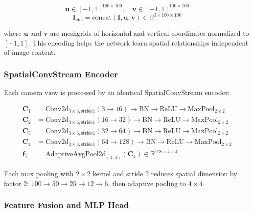 \documentclass[12pt,a4paper,oneside]{report}
\begin{document}
\begin{equation}
\mathbf{u} \in [-1, 1]^{100 \times 100}, \quad \mathbf{v} \in [-1, 1]^{100 \times 100}
\end{equation}
\begin{equation}
\mathbf{I}_{\text{enc}} = \text{concat}(\mathbf{I}, \mathbf{u}, \mathbf{v}) \in \mathbb{R}^{3 \times 100 \times 100}
\end{equation}

where $\mathbf{u}$ and $\mathbf{v}$ are meshgrids of horizontal and vertical coordinates normalized to $[-1, 1]$. This encoding helps the network learn spatial relationships independent of image content.

\subsubsection{SpatialConvStream Encoder}
\label{subsubsec:spatialconvstream_encoder}

Each camera view is processed by an identical SpatialConvStream encoder:

\begin{align}
\mathbf{C}_1 &= \text{Conv2d}_{3\times3,\text{stride}1}(3 \rightarrow 16) \rightarrow \text{BN} \rightarrow \text{ReLU} \rightarrow \text{MaxPool}_{2\times2} \\
\mathbf{C}_2 &= \text{Conv2d}_{3\times3,\text{stride}1}(16 \rightarrow 32) \rightarrow \text{BN} \rightarrow \text{ReLU} \rightarrow \text{MaxPool}_{2\times2} \\
\mathbf{C}_3 &= \text{Conv2d}_{3\times3,\text{stride}1}(32 \rightarrow 64) \rightarrow \text{BN} \rightarrow \text{ReLU} \rightarrow \text{MaxPool}_{2\times2} \\
\mathbf{C}_4 &= \text{Conv2d}_{3\times3,\text{stride}1}(64 \rightarrow 128) \rightarrow \text{BN} \rightarrow \text{ReLU} \rightarrow \text{MaxPool}_{2\times2} \\
\mathbf{f}_1 &= \text{AdaptiveAvgPool2d}_{(4,4)}(\mathbf{C}_4) \in \mathbb{R}^{128 \times 4 \times 4}
\end{align}

Each max pooling with $2 \times 2$ kernel and stride 2 reduces spatial dimension by factor 2: $100 \rightarrow 50 \rightarrow 25 \rightarrow 12 \rightarrow 6$, then adaptive pooling to $4 \times 4$.

\subsubsection{Feature Fusion and MLP Head}
\label{subsubsec:feature_fusion_and_mlp_head}
\end{document}
